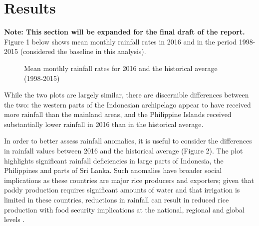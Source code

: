 \documentclass[12pt]{article}
\begin{document}
\section{Results}
\textbf{Note: This section will be expanded for the final draft of the report.}\\

Figure 1 below shows mean monthly rainfall rates in 2016 and in the period 1998-2015 (considered the baseline in this analysis).

\begin{figure}[htb]
    \label{fig:averages}
\centering
  \hfill
  \hfill
\caption{Mean monthly rainfall rates for 2016 and the historical average (1998-2015)}
\end{figure}

While the two plots are largely similar, there are discernible differences between the two: the western parts of the Indonesian archipelago appear to have received more rainfall than the mainland areas, and the Philippine Islands received substantially lower rainfall in 2016 than in the historical average.

In order to better assess rainfall anomalies, it is useful to consider the differences in rainfall values between 2016 and the historical average (Figure 2). The plot highlights significant rainfall deficiencies in large parts of Indonesia, the Philippines and parts of Sri Lanka. Such anomalies have broader social implications as these countries are major rice producers and exporters; given that paddy production requires significant amounts of water and that irrigation is limited in these countries, reductions in rainfall can result in reduced rice production with food security implications at the national, regional and global levels \cite{zubair2002nino, haile2005weather}. 
\end{document}
